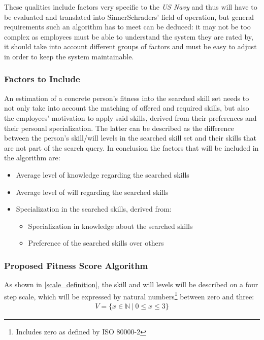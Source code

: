 \label{customizable}
These qualities include factors very specific to the \textit{US Navy} and thus will have to be evaluated and translated into SinnerSchraders' field of operation, but general requirements such an algorithm has to meet can be deduced: it may not be too complex as employees must be able to understand the system they are rated by, it should take into account different groups of factors and must be easy to adjust in order to keep the system maintainable.

\newpage

\subsubsection{Factors to Include}
An estimation of a concrete person's fitness into the searched skill set needs to not only take into account the matching of offered and required skills, but also the employees' motivation to apply said skills, derived from their preferences and their personal specialization. The latter can be described as the difference between the person's skill/will levels in the searched skill set and their skills that are not part of the search query. In conclusion the factors that will be included in the algorithm are:
\begin{itemize}
  \item Average level of knowledge regarding the searched skills
  \item Average level of will regarding the searched skills
  \item Specialization in the searched skills, derived from:
  \begin{itemize}
    \item Specialization in knowledge about the searched skills
    \item Preference of the searched skills over others
  \end{itemize}
\end{itemize}


\subsubsection{Proposed Fitness Score Algorithm}
\label{fitnessscore_impl}
As shown in \ref{scale_definition}, the skill and will levels will be described on a four step scale, which will be expressed by natural numbers\footnote{Includes zero as defined by ISO 80000-2} between zero and three:
\begin{gather*}
  V = \{ x \in \mathbb{N} \ | \  0 \leq x \leq 3\}
\end{gather*}

